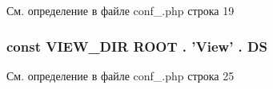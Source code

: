 См. определение в файле conf\-\_\-.\-php строка 19

\hypertarget{conf___8php_ab03c61889740a358477b63e1060ed780}{
\subsubsection[{V\-I\-E\-W\-\_\-\-D\-I\-R}]{\setlength{\rightskip}{0pt plus 5cm}const V\-I\-E\-W\-\_\-\-D\-I\-R {\bf R\-O\-O\-T} . 'View' . {\bf D\-S}}}\label{conf___8php_ab03c61889740a358477b63e1060ed780}


См. определение в файле conf\-\_\-.\-php строка 25

